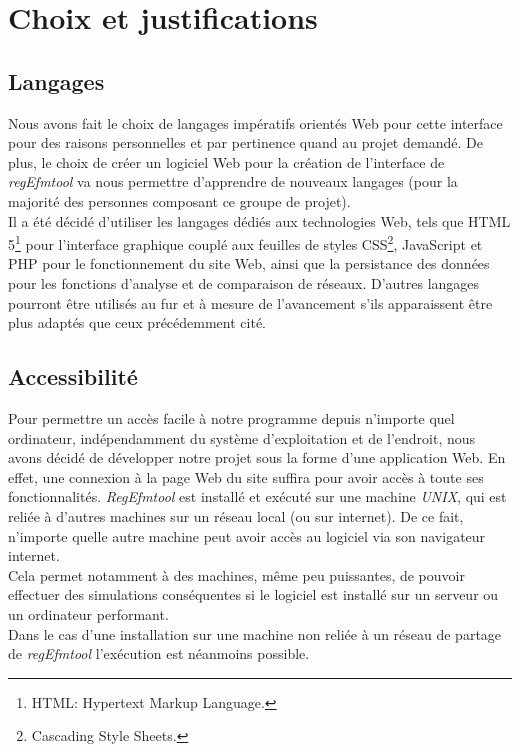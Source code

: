 \chapter{Choix et justifications}

\section{Langages}
Nous avons fait le choix de langages impératifs orientés Web pour cette interface pour des raisons personnelles et par pertinence quand au projet demandé. De plus, le choix de créer un logiciel Web pour la création de l'interface de \emph{regEfmtool} va nous permettre d'apprendre de nouveaux langages (pour la majorité des personnes composant ce groupe de projet). \\
Il a été décidé d'utiliser les langages dédiés aux technologies Web, tels que HTML 5\footnote{HTML: Hypertext Markup Language.} pour l'interface graphique couplé aux feuilles de styles CSS\footnote{Cascading Style Sheets.}, JavaScript et PHP pour le fonctionnement du site Web, ainsi que la persistance des données pour les fonctions d'analyse et de comparaison de réseaux. D'autres langages pourront être utilisés au fur et à mesure de l'avancement s'ils apparaissent être plus adaptés que ceux précédemment cité.

\section{Accessibilité}
Pour permettre un accès facile à notre programme depuis n'importe quel ordinateur, indépendamment du système d'exploitation et de l'endroit, nous avons décidé de développer notre projet sous la forme d'une application Web. En effet, une connexion à la page Web du site suffira pour avoir accès à toute ses fonctionnalités. \emph{RegEfmtool} est installé et exécuté sur une machine \emph{UNIX}, qui est reliée à d'autres machines sur un réseau local (ou sur internet). De ce fait, n'importe quelle autre machine peut avoir accès au logiciel via son navigateur internet.\\
Cela permet notamment à des machines, même peu puissantes, de pouvoir effectuer des simulations conséquentes si le logiciel est installé sur un serveur ou un ordinateur performant.\\
Dans le cas d'une installation sur une machine non reliée à un réseau de partage de \emph{regEfmtool} l'exécution est néanmoins possible.


